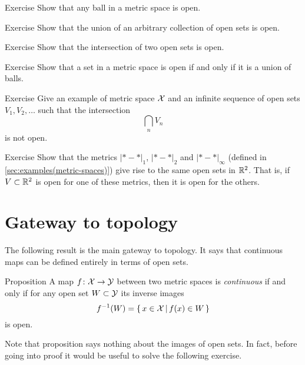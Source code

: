 \begin{thm}{Exercise}\label{ex:ball-is-open}
Show that any ball in a metric space is open.
\end{thm}

\begin{thm}{Exercise}\label{ex:open-union}
Show that the union of an arbitrary collection of open sets is open.
\end{thm}

\begin{thm}{Exercise}\label{ex:open-intersection}
Show that the intersection of two open sets is open.
\end{thm}

\begin{thm}{Exercise}\label{ex:union-of-balls}
Show that a set in a metric space is open if and only if it is a union of balls. 
\end{thm}

\begin{thm}{Exercise}\label{ex:infty-open-intersection}
Give an example of metric space $\mathcal{X}$ and an infinite sequence of open sets $V_1,V_2,\dots$
such that the intersection
\[\bigcap_nV_n\]
is not open.
\end{thm}

\begin{thm}{Exercise}\label{ex:d1+d2+dinfty-open}
Show that the metrics $|{*}-{*}|_1$, $|{*}-{*}|_2$ and $|{*}-{*}|_\infty$ (defined in \ref{sec:examples(metric-spaces)})
give rise to the same open sets in $\mathbb{R}^2$.
That is, if $V\subset \mathbb{R}^2$ is open for one of these metrics, then it is open for the others.
\end{thm}

\section{Gateway to topology}

The following result is the main gateway to topology.
It says that continuous maps can be defined entirely in terms of open sets.

\begin{thm}{Proposition}\label{prop:cont-open}
A map $f\colon\mathcal{X}\to\mathcal{Y}$ 
between two metric spaces is \emph{continuous} 
if and only if for any open set $W\subset\mathcal{Y}$ 
its inverse images
\[f^{-1}(W)=\left\{\,{x\in \mathcal{X}}\,\middle|\,{f(x)\in W}\,\right\}\]
is open.
\end{thm}

Note that proposition says nothing about the images of open sets. In fact, before going into proof it would be useful to solve the following exercise.

